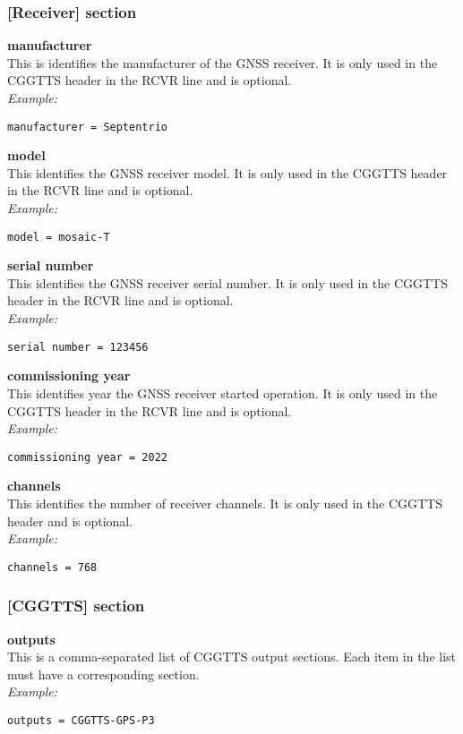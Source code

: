 \subsubsection{[Receiver] section }

{\bfseries manufacturer}\\
This is identifies the manufacturer of the GNSS receiver.
It is only used in the CGGTTS header in the RCVR line and is optional.\\
\textit{Example:}
\begin{lstlisting}
manufacturer = Septentrio
\end{lstlisting}


{\bfseries model}\\
This identifies the GNSS receiver model.
It is only used in the CGGTTS header in the RCVR line and is optional.\\
\textit{Example:}
\begin{lstlisting}
model = mosaic-T
\end{lstlisting}

{\bfseries serial number}\\
This identifies the GNSS receiver serial number.
It is only used in the CGGTTS header in the RCVR line and is optional.\\
\textit{Example:}
\begin{lstlisting}
serial number = 123456
\end{lstlisting}

{\bfseries commissioning year}\\
This identifies year the GNSS receiver started operation.
It is only used in the CGGTTS header in the RCVR line  and is optional.\\
\textit{Example:}
\begin{lstlisting}
commissioning year = 2022
\end{lstlisting}

{\bfseries channels}\\
This identifies the number of receiver channels.
It is only used in the CGGTTS header and is optional.\\
\textit{Example:}
\begin{lstlisting}
channels = 768
\end{lstlisting}

\subsubsection{[CGGTTS] section }

{\bfseries outputs}\\
This is a comma-separated list of CGGTTS output sections.
Each item in the list must have a corresponding section.
\\
\textit{Example:}
\begin{lstlisting}
outputs = CGGTTS-GPS-P3
\end{lstlisting}

